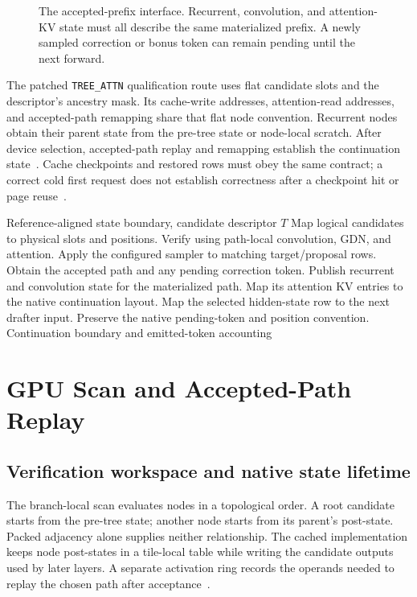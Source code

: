 \documentclass[conference]{IEEEtran}
\begin{document}
\begin{figure}[t]
\centering

\caption{The accepted-prefix interface. Recurrent, convolution, and attention-KV state must all describe the same materialized prefix. A newly sampled correction or bonus token can remain pending until the next forward.}
\label{fig:contract}
\end{figure}

The patched \texttt{TREE\_ATTN} qualification route uses flat candidate slots and the descriptor's ancestry mask. Its cache-write addresses, attention-read addresses, and accepted-path remapping share that flat node convention. Recurrent nodes obtain their parent state from the pre-tree state or node-local scratch. After device selection, accepted-path replay and remapping establish the continuation state~\cite{lumo2026archive}. Cache checkpoints and restored rows must obey the same contract; a correct cold first request does not establish correctness after a checkpoint hit or page reuse~\cite{lumo2026stateless}.

\begin{algorithm}[t]
\caption{Logical verifier and continuation boundary}
\label{alg:verify}
\begin{algorithmic}[1]
\REQUIRE Reference-aligned state boundary, candidate descriptor $T$
\STATE Map logical candidates to physical slots and positions.
\STATE Verify using path-local convolution, GDN, and attention.
\STATE Apply the configured sampler to matching target/proposal rows.
\STATE Obtain the accepted path and any pending correction token.
\STATE Publish recurrent and convolution state for the materialized path.
\STATE Map its attention KV entries to the native continuation layout.
\STATE Map the selected hidden-state row to the next drafter input.
\STATE Preserve the native pending-token and position convention.
\RETURN Continuation boundary and emitted-token accounting
\end{algorithmic}
\end{algorithm}

\section{GPU Scan and Accepted-Path Replay}
\label{sec:kernel}
\subsection{Verification workspace and native state lifetime}
The branch-local scan evaluates nodes in a topological order. A root candidate starts from the pre-tree state; another node starts from its parent's post-state. Packed adjacency alone supplies neither relationship. The cached implementation keeps node post-states in a tile-local table while writing the candidate outputs used by later layers. A separate activation ring records the operands needed to replay the chosen path after acceptance~\cite{lumo2026archive}.
\end{document}
